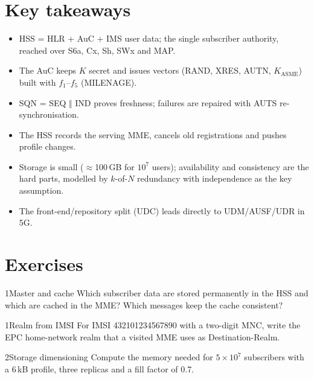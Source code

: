 \documentclass[11pt,a4paper]{article}
\begin{document}
\section{Key takeaways}
\begin{takeawaybox}
\begin{itemize}
  \item HSS = HLR + AuC + IMS user data; the single subscriber authority, reached over S6a, Cx, Sh,
        SWx and MAP.
  \item The AuC keeps $K$ secret and issues vectors (RAND, XRES, AUTN, $K_{\mathrm{ASME}}$) built with
        $f_1$--$f_5$ (MILENAGE).
  \item SQN = SEQ $\Vert$ IND proves freshness; failures are repaired with AUTS re-synchronisation.
  \item The HSS records the serving MME, cancels old registrations and pushes profile changes.
  \item Storage is small ($\approx$100\,GB for $10^7$ users); availability and consistency are the hard
        parts, modelled by $k$-of-$N$ redundancy with independence as the key assumption.
  \item The front-end/repository split (UDC) leads directly to UDM/AUSF/UDR in 5G.
\end{itemize}
\end{takeawaybox}

\section{Exercises}

\begin{exercisebox}{1}{Master and cache}\label{exr:split}
Which subscriber data are stored permanently in the HSS and which are cached in the MME? Which messages
keep the cache consistent?
\end{exercisebox}

\begin{exercisebox}{1}{Realm from IMSI}\label{exr:realm}
For IMSI 432101234567890 with a two-digit MNC, write the EPC home-network realm that a visited MME uses
as Destination-Realm.
\end{exercisebox}

\begin{exercisebox}{2}{Storage dimensioning}\label{exr:storage}
Compute the memory needed for $5\times10^7$ subscribers with a 6\,kB profile, three replicas and a fill
factor of 0.7.
\end{exercisebox}
\end{document}
